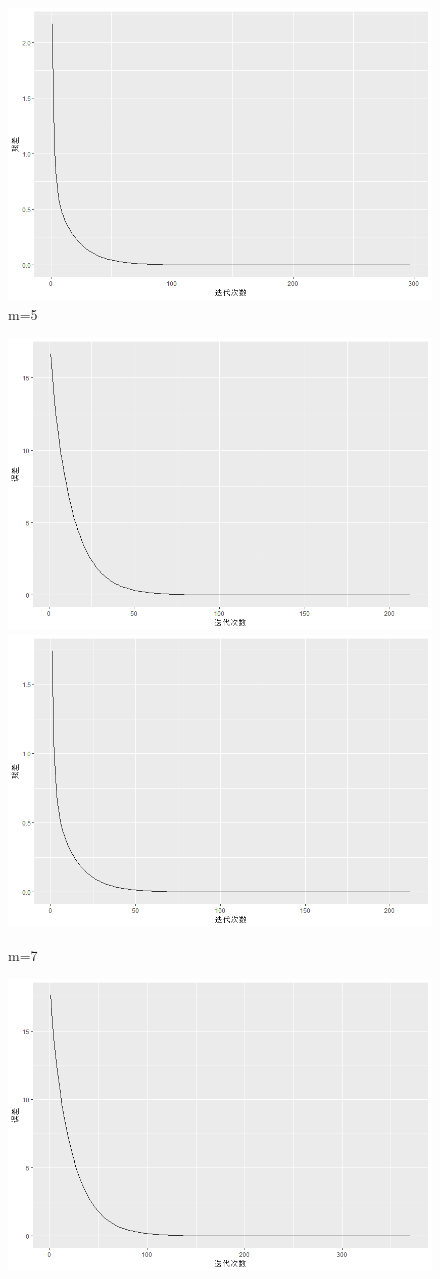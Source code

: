 \documentclass[10pt]{article}
\begin{document}
\begin{enumerate}
\begin{figure}[H]
  \includegraphics[width=.8\textwidth]{4-m=52.png}
  \caption{m=5}
  \end{figure}
  \begin{figure}[H]
  \centering
  \includegraphics[width=.8\textwidth]{4-m=71.png}
  \includegraphics[width=.8\textwidth]{4-m=72.png}
  \caption{m=7}
  \end{figure}
  \begin{figure}[H]
  \centering
  \includegraphics[width=.8\textwidth]{4-m=81.png}

\end{figure}
\end{enumerate}
\end{document}
